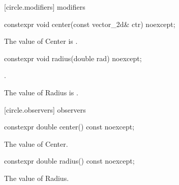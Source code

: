  [circle.modifiers]{ modifiers}

\begin{itemdecl}
constexpr void center(const vector_2d& ctr) noexcept;
\end{itemdecl}

\begin{itemdescr}
\pnum
\effects
The value of Center is .
\end{itemdescr}

\begin{itemdecl}
constexpr void radius(double rad) noexcept;
\end{itemdecl}
\begin{itemdescr}
\preconditions
{}.

\pnum
\effects
The value of Radius is .
\end{itemdescr}

 [circle.observers]{ observers}

\begin{itemdecl}
constexpr double center() const noexcept;
\end{itemdecl}
\begin{itemdescr}
\pnum
\returns
The value of Center.
\end{itemdescr}

\begin{itemdecl}
constexpr double radius() const noexcept;
\end{itemdecl}
\begin{itemdescr}
\pnum
\returns
The value of Radius.
\end{itemdescr}
